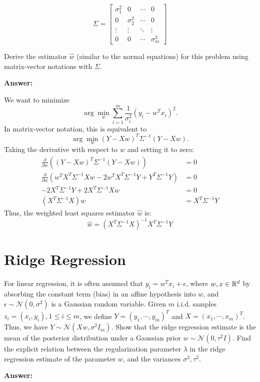 \documentclass{article}
\begin{document}
$$\Sigma = \begin{bmatrix}
    \sigma_1^2 & 0 & \cdots & 0\\
    0 & \sigma_2^2 & \cdots & 0\\
    \vdots & \vdots & \ddots & \vdots\\
    0 & 0 & \cdots & \sigma_m^2
\end{bmatrix}$$

Derive the estimator $\hat{w}$ (similar to the normal equations) for this problem using matrix-vector notations with $\Sigma$.

\textbf{Answer:}

We want to minimize
$$\arg\min_w \sum_{i=1}^{m} \frac{1}{\sigma_i^2}(y_i - w^T x_i)^2.$$
In matrix-vector notation, this is equivalent to
$$\arg\min_w (Y - Xw)^T \Sigma^{-1} (Y - Xw).$$
Taking the derivative with respect to $w$ and setting it to zero:
\begin{align*}
    \frac{\partial}{\partial w}\left((Y - Xw)^T \Sigma^{-1} (Y - Xw)\right) &= 0\\
    \frac{\partial}{\partial w}\left(w^T X^T \Sigma^{-1} X w - 2w^T X^T \Sigma^{-1} Y + Y^T \Sigma^{-1} Y\right) &= 0\\
    -2X^T \Sigma^{-1} Y + 2X^T \Sigma^{-1} Xw &= 0\\
    (X^T \Sigma^{-1} X)w &= X^T \Sigma^{-1} Y
\end{align*}
Thus, the weighted least squares estimator $\hat{w}$ is:
$$\hat{w} = (X^T \Sigma^{-1} X)^{-1} X^T \Sigma^{-1} Y$$

\section{Ridge Regression}

For linear regression, it is often assumed that $y_i = w^Tx_i + \epsilon$, where $w, x \in \mathbb{R}^d$ by absorbing the constant term (bias) in an affine hypothesis into $w$, and $\epsilon \sim \mathcal{N}(0, \sigma^2)$ is a Gaussian random variable.
Given $m$ i.i.d. samples $z_i = (x_i, y_i), 1 \leq i \leq m$, we define $Y = (y_1, \cdots, y_m)^T$ and $X = (x_1, \cdots, x_m)^T$.
Thus, we have $Y \sim \mathcal{N}(Xw, \sigma^2I_m)$.
Show that the ridge regression estimate is the mean of the posterior distribution under a Gaussian prior $w \sim \mathcal{N}(0, \tau^2I).$
Find the explicit relation between the regularization parameter $\lambda$ in the ridge regression estimate of the parameter $w$, and the variances $\sigma^2, \tau^2$.

\textbf{Answer:}
\end{document}

